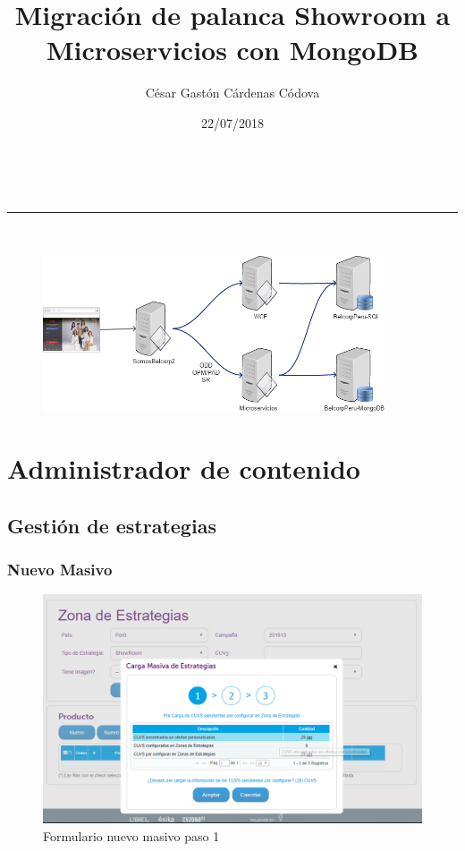 \documentclass[a4paper,11pt]{paper}
\makeatletter
\newcommand{\linia}{\rule{\linewidth}{0.5pt}}
\renewcommand{\maketitle}{
\begin{center}
\vspace{2ex}
{\huge \textsc{\@title}}
\vspace{1ex}
\\
\linia\\
\@author \hfill \@date
\vspace{4ex}
\end{center}
}
\makeatother
\begin{document}
\title{Migración de palanca Showroom a Microservicios con MongoDB}

\author{César Gastón Cárdenas Códova}

\date{22/07/2018}
\maketitle
\vspace*{\fill}
\begin{figure}[!h]
\centering
\includegraphics[width=0.9\textwidth]{imgs/arquitectura.png}
\end{figure}
\vspace*{\fill}

\newpage
\tableofcontents
\newpage
{}
 \listoffigures
\newpage
{}
\section{Administrador de contenido}

\subsection{Gestión de estrategias}

\subsubsection{Nuevo Masivo}
\begin{figure}[h]
\centering
\includegraphics[width=1.0\textwidth]{imgs/Estrategia/FormularioNuevoMasivo.png}
\caption{Formulario nuevo masivo paso 1}
\end{figure}
\end{document}
